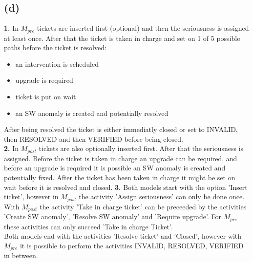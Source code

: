 \documentclass[../../main.tex]{subfiles}
\begin{document}
\subsection*{(d)}
\textbf{1.} In $M_{pre}$ tickets are inserted first (optional) and then the seriousness is assigned at least once. After that the ticket is taken in charge and set on 1 of 5 possible paths before the ticket is resolved:
\begin{itemize}
\item an intervention is scheduled
\item upgrade is required
\item ticket is put on wait
\item an SW anomaly is created and potentially resolved
\end{itemize} 
After being resolved the ticket is either immediatly closed or set to INVALID, then RESOLVED and then VERIFIED before being closed.\\
\textbf{2.} In $M_{post}$ tickets are also optionally inserted first. After that the seriousness is assigned. Before the ticket is taken in charge an upgrade can be required, and before an upgrade is required it is possible an SW anomaly is created and potentially fixed.
After the ticket has been taken in charge it might be set on wait before it is resolved and closed.
\textbf{3.} Both models start with the option 'Insert ticket', however in $M_{post}$ the activity 'Assign seriousness' can only be done once.\\
With $M_{post}$ the activity 'Take in charge ticket' can be preceeded by the activities 'Create SW anomaly', 'Resolve SW anomaly' and 'Require upgrade'. For $M_{pre}$ these activities can only succeed 'Take in charge Ticket'.\\
Both models end with the activities 'Resolve ticket' and 'Closed', however with $M_{pre}$ it is possible to perform the activities INVALID, RESOLVED, VERIFIED in between.
\end{document}
